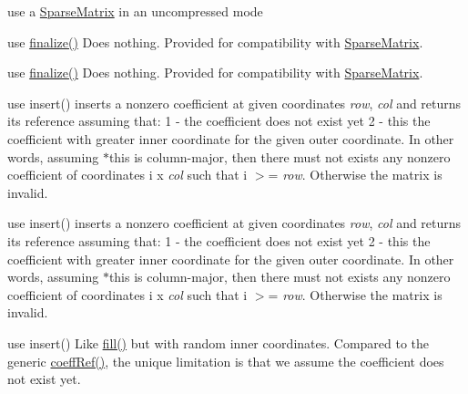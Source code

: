 \begin{DoxyRefList}
use a \hyperlink{group___sparse_core___module_class_eigen_1_1_sparse_matrix}{Sparse\+Matrix} in an uncompressed mode 
\item[\label{deprecated__deprecated000044}%
\Hypertarget{deprecated__deprecated000044}%
Member \hyperlink{class_eigen_1_1_dynamic_sparse_matrix_aa806b3dde0a055844110610907b016f3}{Eigen\+:\+:Dynamic\+Sparse\+Matrix$<$ \+\_\+\+Scalar, \+\_\+\+Options, \+\_\+\+Storage\+Index $>$\+:\+:end\+Fill} ()]use \hyperlink{class_eigen_1_1_dynamic_sparse_matrix_aa0abc0e4565143f103f0d7373bd4a125}{finalize()} Does nothing. Provided for compatibility with \hyperlink{group___sparse_core___module_class_eigen_1_1_sparse_matrix}{Sparse\+Matrix}. 

use \hyperlink{class_eigen_1_1_dynamic_sparse_matrix_aa0abc0e4565143f103f0d7373bd4a125}{finalize()} Does nothing. Provided for compatibility with \hyperlink{group___sparse_core___module_class_eigen_1_1_sparse_matrix}{Sparse\+Matrix}.  
\item[\label{deprecated__deprecated000042}%
\Hypertarget{deprecated__deprecated000042}%
Member \hyperlink{class_eigen_1_1_dynamic_sparse_matrix_a70c8f529b38fd5b7d93d6dfe1a122723}{Eigen\+:\+:Dynamic\+Sparse\+Matrix$<$ \+\_\+\+Scalar, \+\_\+\+Options, \+\_\+\+Storage\+Index $>$\+:\+:fill} (Index row, Index col)]use insert() inserts a nonzero coefficient at given coordinates {\itshape row}, {\itshape col} and returns its reference assuming that\+: 1 -\/ the coefficient does not exist yet 2 -\/ this the coefficient with greater inner coordinate for the given outer coordinate. In other words, assuming {\ttfamily $\ast$this} is column-\/major, then there must not exists any nonzero coefficient of coordinates {\ttfamily i} {\ttfamily x} {\itshape col} such that {\ttfamily i} $>$= {\itshape row}. Otherwise the matrix is invalid.

use insert() inserts a nonzero coefficient at given coordinates {\itshape row}, {\itshape col} and returns its reference assuming that\+: 1 -\/ the coefficient does not exist yet 2 -\/ this the coefficient with greater inner coordinate for the given outer coordinate. In other words, assuming {\ttfamily $\ast$this} is column-\/major, then there must not exists any nonzero coefficient of coordinates {\ttfamily i} {\ttfamily x} {\itshape col} such that {\ttfamily i} $>$= {\itshape row}. Otherwise the matrix is invalid. 
\item[\label{deprecated__deprecated000043}%
\Hypertarget{deprecated__deprecated000043}%
Member \hyperlink{class_eigen_1_1_dynamic_sparse_matrix_a6a5eb3c9d153d8ebdf4e0967321108e2}{Eigen\+:\+:Dynamic\+Sparse\+Matrix$<$ \+\_\+\+Scalar, \+\_\+\+Options, \+\_\+\+Storage\+Index $>$\+:\+:fillrand} (Index row, Index col)]use insert() Like \hyperlink{class_eigen_1_1_dynamic_sparse_matrix_a70c8f529b38fd5b7d93d6dfe1a122723}{fill()} but with random inner coordinates. Compared to the generic \hyperlink{class_eigen_1_1_dynamic_sparse_matrix_a17093cd39bd0e6ebd6250bc5feb61a0f}{coeff\+Ref()}, the unique limitation is that we assume the coefficient does not exist yet. 


\end{DoxyRefList}
